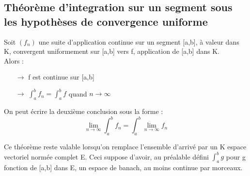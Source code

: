 \subsection{Théorème d'integration sur un segment sous les hypothèses de convergence uniforme}
\begin{theo}
Soit $(f_n)$ une suite d'application continue sur un segment [a,b], à valeur dans K, convergent uniformement sur [a,b] vers f, application de [a,b] dans K.\\
Alors : \\
\begin{itemize}
 \item[$\rightarrow$] f est continue sur [a,b]\\
 \item[$\rightarrow$] $\int_a^b f_n = \int_a^b f$ quand $n\rightarrow\infty$ \\
\end{itemize}
On peut écrire la deuxième conclusion sous la forme : 
$$\lim_{n\rightarrow\infty} \int_a^b f_n = \int_a^b \lim_{n\rightarrow\infty} f_n$$
\end{theo}
\begin{gene}
Ce théorème reste valable lorsqu'on remplace l'ensemble d'arrivé par un K espace vectoriel normée complet E. Ceci suppose d'avoir, au préalable défini $\int_a^b g$ pour g fonction de [a,b] dans E, un espace de banach, au moins continue par morceaux.
\end{gene}
